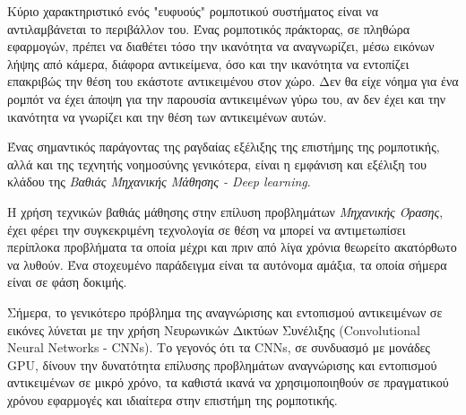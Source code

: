 Κύριο χαρακτηριστικό ενός "ευφυούς" ρομποτικού συστήματος είναι να αντιλαμβάνεται
το περιβάλλον του.
Ένας ρομποτικός πράκτορας, σε πληθώρα εφαρμογών, πρέπει να διαθέτει τόσο την
ικανότητα να αναγνωρίζει, μέσω εικόνων λήψης από κάμερα, διάφορα αντικείμενα,
όσο και την ικανότητα να εντοπίζει επακριβώς την θέση του
εκάστοτε αντικειμένου στον χώρο. Δεν θα είχε νόημα για ένα ρομπότ να έχει άποψη
για την παρουσία αντικειμένων γύρω του, αν δεν έχει και την ικανότητα να γνωρίζει
και την θέση των αντικειμένων αυτών. %

Ένας σημαντικός παράγοντας της ραγδαίας εξέλιξης της επιστήμης της ρομποτικής, αλλά
και της τεχνητής νοημοσύνης γενικότερα, είναι η εμφάνιση και εξέλιξη του κλάδου
της \emph{Βαθιάς Μηχανικής Μάθησης - Deep learning}.

Η χρήση τεχνικών βαθιάς μάθησης στην επίλυση προβλημάτων \emph{Μηχανικής Όρασης},
έχει φέρει την συγκεκριμένη τεχνολογία σε θέση να μπορεί να αντιμετωπίσει
περίπλοκα προβλήματα τα οποία μέχρι και πριν από λίγα χρόνια θεωρείτο ακατόρθωτο να λυθούν.
Ένα στοχευμένο παράδειγμα είναι τα αυτόνομα αμάξια, τα οποία σήμερα είναι σε
φάση δοκιμής.

Σήμερα, το γενικότερο πρόβλημα της αναγνώρισης και εντοπισμού αντικειμένων σε εικόνες
λύνεται με την χρήση Νευρωνικών Δικτύων Συνέλιξης (Convolutional Neural Networks - CNNs).
Το γεγονός ότι τα CNΝs, σε συνδυασμό με μονάδες GPU, δίνουν την δυνατότητα
επίλυσης προβλημάτων αναγνώρισης και εντοπισμού αντικειμένων σε μικρό χρόνο,
τα καθιστά ικανά να χρησιμοποιηθούν σε πραγματικού χρόνου εφαρμογές
και ιδιαίτερα στην επιστήμη της ρομποτικής.





